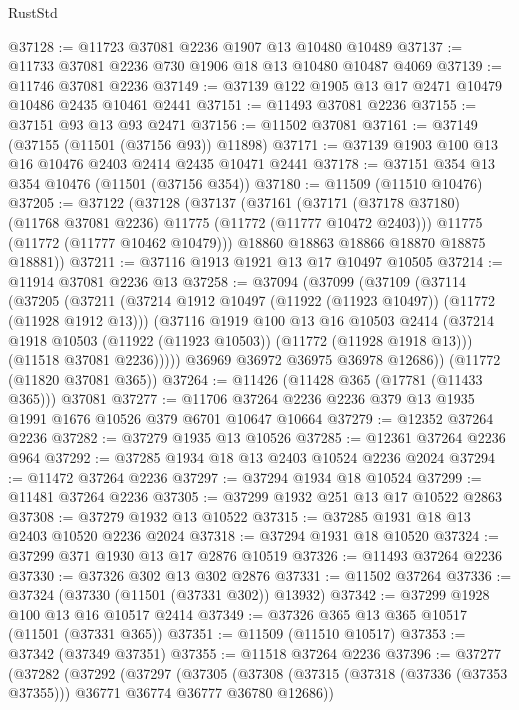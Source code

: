 \begin{lexlean}{RustStd}
\begin{coremodule}
@37128 := @11723 @37081 @2236 @1907 @13 @10480 @10489
@37137 := @11733 @37081 @2236 @730 @1906 @18 @13 @10480 @10487 @4069
@37139 := @11746 @37081 @2236
@37149 := @37139 @122 @1905 @13 @17 @2471 @10479 @10486 @2435 @10461 @2441
@37151 := @11493 @37081 @2236
@37155 := @37151 @93 @13 @93 @2471
@37156 := @11502 @37081
@37161 := @37149 (@37155 (@11501 (@37156 @93)) @11898)
@37171 := @37139 @1903 @100 @13 @16 @10476 @2403 @2414 @2435 @10471 @2441
@37178 := @37151 @354 @13 @354 @10476 (@11501 (@37156 @354))
@37180 := @11509 (@11510 @10476)
@37205 := @37122
    (@37128
      (@37137
        (@37161
          (@37171 (@37178 @37180) (@11768 @37081 @2236) @11775 (@11772 (@11777 @10472 @2403)))
          @11775
          (@11772 (@11777 @10462 @10479)))
        @18860
        @18863
        @18866
        @18870
        @18875
        @18881))
@37211 := @37116 @1913 @1921 @13 @17 @10497 @10505
@37214 := @11914 @37081 @2236 @13
@37258 := @37094
    (@37099
      (@37109
        (@37114
          (@37205
            (@37211
              (@37214 @1912 @10497 (@11922 (@11923 @10497)) (@11772 (@11928 @1912 @13)))
              (@37116
                @1919
                @100
                @13
                @16
                @10503
                @2414
                (@37214 @1918 @10503 (@11922 (@11923 @10503)) (@11772 (@11928 @1918 @13)))
                (@11518 @37081 @2236)))))
        @36969
        @36972
        @36975
        @36978
        @12686))
    (@11772 (@11820 @37081 @365))
@37264 := @11426 (@11428 @365 (@17781 (@11433 @365))) @37081
@37277 := @11706 @37264 @2236 @2236 @379 @13 @1935 @1991 @1676 @10526 @379 @6701 @10647 @10664
@37279 := @12352 @37264 @2236
@37282 := @37279 @1935 @13 @10526
@37285 := @12361 @37264 @2236 @964
@37292 := @37285 @1934 @18 @13 @2403 @10524 @2236 @2024
@37294 := @11472 @37264 @2236
@37297 := @37294 @1934 @18 @10524
@37299 := @11481 @37264 @2236
@37305 := @37299 @1932 @251 @13 @17 @10522 @2863
@37308 := @37279 @1932 @13 @10522
@37315 := @37285 @1931 @18 @13 @2403 @10520 @2236 @2024
@37318 := @37294 @1931 @18 @10520
@37324 := @37299 @371 @1930 @13 @17 @2876 @10519
@37326 := @11493 @37264 @2236
@37330 := @37326 @302 @13 @302 @2876
@37331 := @11502 @37264
@37336 := @37324 (@37330 (@11501 (@37331 @302)) @13932)
@37342 := @37299 @1928 @100 @13 @16 @10517 @2414
@37349 := @37326 @365 @13 @365 @10517 (@11501 (@37331 @365))
@37351 := @11509 (@11510 @10517)
@37353 := @37342 (@37349 @37351)
@37355 := @11518 @37264 @2236
@37396 := @37277
    (@37282
      (@37292
        (@37297
          (@37305
            (@37308 (@37315 (@37318 (@37336 (@37353 @37355))) @36771 @36774 @36777 @36780 @12686))

\end{coremodule}
\end{lexlean}
